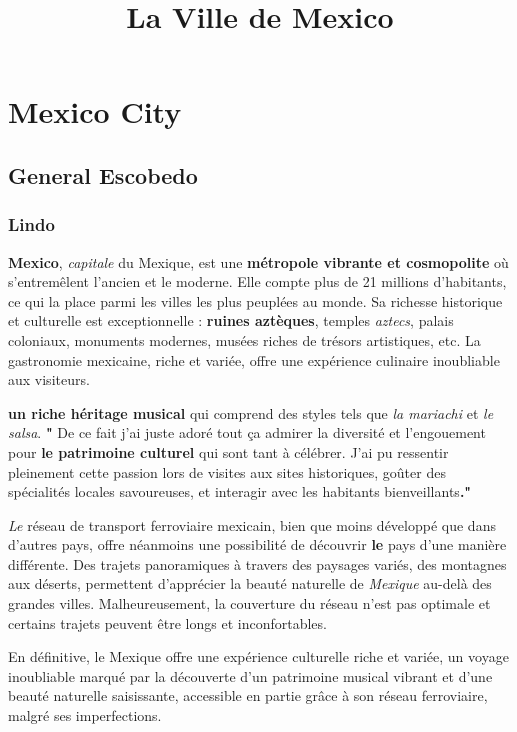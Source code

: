 \documentclass[12pt, a4paper]{article}
\title{La Ville de Mexico}
\author{}
\date{}
\begin{document}
   \maketitle

\section*{Mexico City}

\subsection{General Escobedo}

\subsubsection{Lindo}

\textbf{Mexico}, \textit{capitale} du Mexique, est une \textbf{métropole vibrante et cosmopolite} où s'entremêlent l'ancien et le moderne. Elle compte plus de 21 millions d'habitants, ce qui la place parmi les villes les plus peuplées au monde. Sa richesse historique et culturelle est exceptionnelle : \textbf{ruines aztèques}, temples \textit{aztecs}, palais coloniaux, monuments modernes, musées riches de trésors artistiques, etc. La gastronomie mexicaine, riche et variée, offre une expérience culinaire inoubliable aux visiteurs.

\textbf{un riche héritage musical} qui comprend des styles tels que \textit{la mariachi} et \textit{le salsa}. \textbf{"}
De ce fait j'ai juste adoré tout ça admirer la diversité et l’engouement pour \textbf{le patrimoine culturel} qui sont tant à célébrer. J’ai pu ressentir pleinement cette passion lors de visites aux sites historiques, goûter des spécialités locales savoureuses, et interagir avec les habitants bienveillants\textbf{."}

\textit{Le} réseau de transport ferroviaire mexicain, bien que moins développé que dans d’autres pays, offre néanmoins une possibilité de découvrir \textbf{le} pays d’une manière différente.  Des trajets panoramiques à travers des paysages variés, des montagnes aux déserts, permettent d’apprécier la beauté naturelle de \textit{Mexique} au-delà des grandes villes.  Malheureusement, la couverture du réseau n’est pas optimale et certains trajets peuvent être longs et inconfortables.

En définitive, le Mexique offre une expérience culturelle riche et variée, un voyage inoubliable marqué par la découverte d'un patrimoine musical vibrant et d'une beauté naturelle saisissante, accessible en partie grâce à son réseau ferroviaire, malgré ses imperfections.
\end{document}
